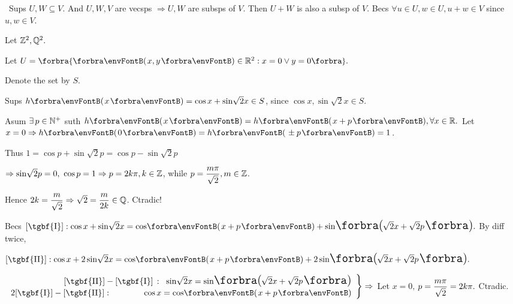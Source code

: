 \BulletPointX{}\,\,\,Sups $U,W\subseteq V.$ And $U,W,V$ are vecsps $\Rightarrow U,W$ are subsps of $V.$\TextB{}
Then $U+W$ is also a subsp of $V.$ Becs $\forall u\in U,w\in U,u+w\in V$ since $u,w\in V.$
\SepLine

Let ${\mathbb{Z}}^2,{\mathbb{Q}}^2.$\SepLine

Let $U=\Bra{\Par{x,y}\in\Rbb^2:x=0\vee y=0}.$\par
\SepLine

Denote the set by $S$.\par\quad
Sups $h\Par{x}=\cos x+\sin\!\sqrt{2}x\in S$, since $\cos x,\sin\!\sqrt{2}x\in S$.\par\quad
Asum $\exists\,p\in{\mathbb{N}^+}$ suth $h\Par{x}=h\Par{x+p},\forall x\in\Rbb.$ Let $x=0\Rightarrow h\Par{0}=h\Par{\pm p}=1$.\par\quad
Thus $1=\cos p+\sin\!\sqrt{2}p=\cos p-\sin\!\sqrt{2}p$\par\quad
$\Rightarrow\sin\!\sqrt{2}p=0,\,\,\cos p=1\Rightarrow p=2k\pi,k\in{\mathbb{Z}}$, while $p={\displaystyle{\frac{m\pi}{\sqrt{2}}}},m\in{\mathbb{Z}}$.\par\vspace{-2pt}\quad
Hence $2k={\displaystyle{\frac{m}{\sqrt{2}}}}\Rightarrow \sqrt{2}={\displaystyle{\frac{m}{2k}}}\in{\mathbb{Q}}$. Ctradic!\PfEnd\vspace{10pt}\par\quad
\Or Becs $[\text{\tgbf{I}}]: \cos x+\sin\!\sqrt{2}x=\cos\!\Par{x+p}+\sin\!\envFontLarge\BigPar{\!\sqrt{2}x+\sqrt{2}p}.$ By diff twice,\par\vspace{2pt}\qquad\qquad\qquad\hspace{0pt}
$[\text{\tgbf{II}}]: \cos x+2\sin\!\sqrt{2}x=\cos\!\Par{x+p}+2\envFontLarge\sin\!\BigPar{\!\sqrt{2}x+\sqrt{2}p}.$\par\vspace{6pt}\quad
$\MathRightBrace{r}{
	[\text{\tgbf{II}}]-[\text{\tgbf{I}}]\,:\;\;\sin\!\sqrt{2}x=\sin\!{\envFontLarge\BigPar{\!\sqrt{2}x+\sqrt{2}p}}\vspace{2pt}\\ 
	2[\text{\tgbf{I}}]-[\text{\tgbf{II}}]:\qquad\qquad\hspace{-1pt} \cos x=\cos\!\Par{x+p}}\Rightarrow$ Let $x=0,$\;\,$ p={\displaystyle{\frac{m\pi}{\sqrt{2}}}}=2k\pi.$\; Ctradic.\PfEnd\vspace{4pt}\par
\SepLine

